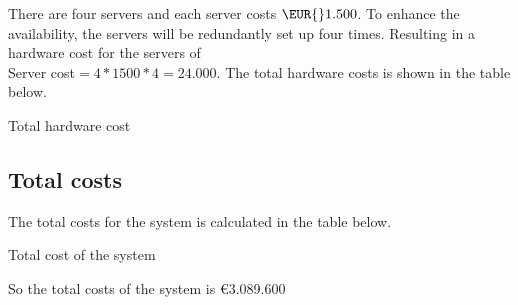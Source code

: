 There are four servers and each server costs $\EUR{}1.500$. To enhance the availability, the servers will be redundantly set up four times. Resulting in a hardware cost for the servers of\\
Server cost$=4*1500*4=24.000$. 
The total hardware costs is shown in the table below.
\begin{table}[H]
\caption{Total hardware cost}
\label{table:total-hardw-cost}
\end{table}

\subsection{Total costs}
The total costs for the system is calculated in the table below.\\
\newline
\begin{table}[H]
\caption{Total cost of the system}
\label{table:totalcosts}
\end{table}
So the total costs of the system is \euro{}3.089.600\\

